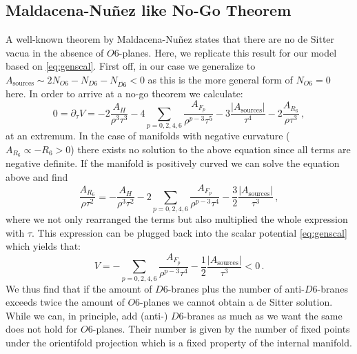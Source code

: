 \documentclass[a4paper,12pt]{report}
\newcommand{\be}{\begin{equation}}
\newcommand{\ee}{\end{equation}}
\begin{document}
\subsection{Maldacena-Nu\~nez like No-Go Theorem}
A well-known theorem by Maldacena-Nu\~nez \cite{Maldacena:2000mw} states that there are no de Sitter vacua in the absence of $O6$-planes. Here, we replicate this result for our model based on \eqref{eq:genscal}. First off, in our case we generalize to $A_{\text{sources}} \sim 2 N_{O6} - N_{D6} - N_{\overline{D6}} < 0$ as this is the more general form of $N_{O6}=0$ here. In order to arrive at a no-go theorem we calculate:
\be 
0= \partial_\tau V = -2 \frac{A_H}{\rho^ 3 \tau^3} - 4 \sum_{p=0,2,4,6} \frac{A_{F_p}}{\rho^ {p-3}\tau^ 5} - 3 \frac{|A_{\text{sources}}|}{\tau^ 4} - 2 \frac{A_{R_6}}{\rho \tau^3}\,,
\ee
at an extremum. In the case of manifolds with negative curvature ($A_{R_6} \propto -R_6 >0$) there exists no solution to the above equation since all terms are negative definite. If the manifold is positively curved we can solve the equation above and find 
\be 
\frac{A_{R_6}}{\rho \tau^ 2} = - \frac{A_H}{\rho^ 3 \tau^2} - 2 \sum_{p=0,2,4,6} \frac{A_{F_p}}{\rho^ {p-3}\tau^ 4} - \frac{3}{2} \frac{|A_{\text{sources}}|}{\tau^ 3}\,,
\ee
where we not only rearranged the terms but also multiplied the whole expression with $\tau$. This expression can be plugged back into the scalar potential \eqref{eq:genscal} which yields that:
\be 
V = -\sum_{p=0,2,4,6} \frac{A_{F_p}}{\rho^ {p-3}\tau^ 4} - \frac{1}{2} \frac{|A_{\text{sources}}|}{\tau^ 3} < 0\,.
\ee
We thus find that if the amount of $D6$-branes plus the number of anti-$D6$-branes exceeds twice the amount of $O6$-planes we cannot obtain a de Sitter solution. While we can, in principle, add (anti-) $D6$-branes as much as we want the same does not hold for $O6$-planes. Their number is given by the number of fixed points under the orientifold projection which is a fixed property of the internal manifold.
\end{document}
